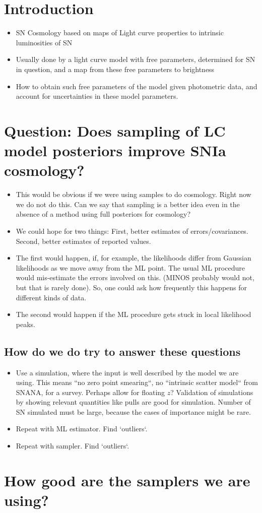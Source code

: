 \documentclass{article}[12pt]
\begin{document}
\section{Introduction}
\begin{itemize}
\item SN Cosmology based on maps of Light curve properties to intrinsic luminosities of SN
\item Usually done by a light curve model with free parameters, determined for SN in question, and a map from these free parameters to brightness  
\item How to obtain such free parameters of the model given photometric data, and account for uncertainties in these model parameters.
\end{itemize}
\section{Question: Does sampling of LC model posteriors improve SNIa cosmology?}
\begin{itemize}
\item  This would be obvious if we were using samples to do cosmology. Right
now we do not do this. Can we say that sampling is a better idea even in the 
absence of a method using full posteriors for cosmology?
\item We could hope for two things: First, better estimates of errors/covariances. Second, better estimates of reported values.
\item The first would happen, if, for example, the likelihoods differ from 
Gaussian likelihoods as we move away from the ML point. The usual ML procedure
would mis-estimate the errors involved on this. (MINOS probably would not, but
that is rarely done). So, one could ask how frequently this happens for
different kinds of data. 
\item The second would happen if the ML procedure gets stuck in local 
likelihood peaks. 
\end{itemize}
\subsection{How do we do try to answer these questions}
\begin{itemize}
\item Use a simulation, where the input is well described by the model we are 
using. This means ``no zero point smearing``, no ``intrinsic scatter model`` 
from SNANA, for a survey. Perhaps allow for floating $z$? Validation of simulations by showing relevant quantities like pulls 
are good for simulation. Number of SN simulated must be large, because the cases of importance might be rare.
\item Repeat with ML estimator.  Find `outliers`. 
\item Repeat with sampler. Find `outliers`. 
\end{itemize}
\section{How good are the samplers we are using?}
\end{document}
